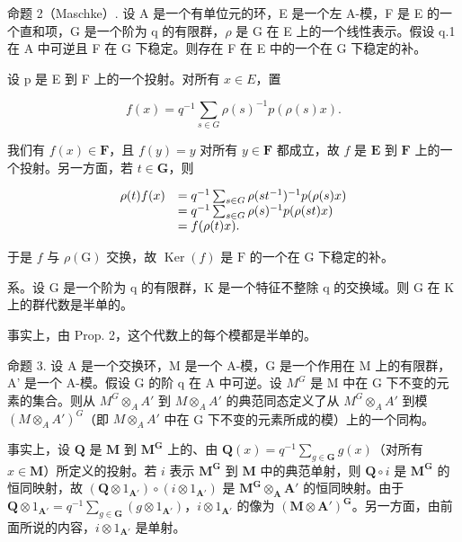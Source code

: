命题 2（Maschke）. 设 A 是一个有单位元的环，E 是一个左 A-模，F 是 E 的一个直和项，G 是一个阶为 q 的有限群，\(\rho\) 是 G 在 E 上的一个线性表示。假设 q.1 在 A 中可逆且 F 在 G 下稳定。则存在 F 在 E 中的一个在 G 下稳定的补。

设 p 是 E 到 F 上的一个投射。对所有 \(x \in E\)，置

\[
f (x) = q ^ {- 1} \sum_ {s \in G} \rho (s) ^ {- 1} p (\rho (s) x).
\]

我们有 \(f(x) \in \mathbf{F}\)，且 \(f(y) = y\) 对所有 \(y \in \mathbf{F}\) 都成立，故 \(f\) 是 \(\mathbf{E}\) 到 \(\mathbf{F}\) 上的一个投射。另一方面，若 \(t \in \mathbf{G}\)，则

\[
\begin{array}{r l} \rho (t) f (x) & = q ^ {- 1} \sum_ {s \in G} \rho (s t ^ {- 1}) ^ {- 1} p (\rho (s) x) \\ & = q ^ {- 1} \sum_ {s \in G} \rho (s) ^ {- 1} p (\rho (s t) x) \\ & = f (\rho (t) x). \end{array}
\]

于是 \(f\) 与 \(\rho(\mathrm{G})\) 交换，故 \(\operatorname{Ker}(f)\) 是 \(\mathrm{F}\) 的一个在 \(\mathrm{G}\) 下稳定的补。

系。设 G 是一个阶为 q 的有限群，K 是一个特征不整除 q 的交换域。则 G 在 K 上的群代数是半单的。

事实上，由 Prop. 2，这个代数上的每个模都是半单的。

命题 3. 设 A 是一个交换环，M 是一个 A-模，G 是一个作用在 M 上的有限群，A' 是一个 A-模。假设 G 的阶 q 在 A 中可逆。设 \(M^{G}\) 是 M 中在 G 下不变的元素的集合。则从 \(M^{G} \otimes_{A} A'\) 到 \(M \otimes_{A} A'\) 的典范同态定义了从 \(M^{G} \otimes_{A} A'\) 到模 \((M \otimes_{A} A')^{G}\)（即 \(M \otimes_{A} A'\) 中在 G 下不变的元素所成的模）上的一个同构。

事实上，设 \(\mathbf{Q}\) 是 \(\mathbf{M}\) 到 \(\mathbf{M}^{\mathbf{G}}\) 上的、由 \(\mathbf{Q}(x) = q^{-1}\sum_{g\in \mathbf{G}}g(x)\)（对所有 \(x\in \mathbf{M}\)）所定义的投射。若 \(i\) 表示 \(\mathbf{M}^{\mathbf{G}}\) 到 \(\mathbf{M}\) 中的典范单射，则 \(\mathbf{Q}\circ i\) 是 \(\mathbf{M}^{\mathbf{G}}\) 的恒同映射，故 \((\mathbf{Q}\otimes 1_{\mathbf{A}'})\circ (i\otimes 1_{\mathbf{A}'})\) 是 \(\mathbf{M}^{\mathbf{G}}\otimes_{\mathbf{A}}\mathbf{A}'\) 的恒同映射。由于 \(\mathbf{Q}\otimes 1_{\mathbf{A}'} = q^{-1}\sum_{g\in \mathbf{G}}(g\otimes 1_{\mathbf{A}'})\)，\(i\otimes 1_{\mathbf{A}'}\) 的像为 \((\mathbf{M}\otimes \mathbf{A}')^{\mathbf{G}}\)。另一方面，由前面所说的内容，\(i\otimes 1_{\mathbf{A}'}\) 是单射。

